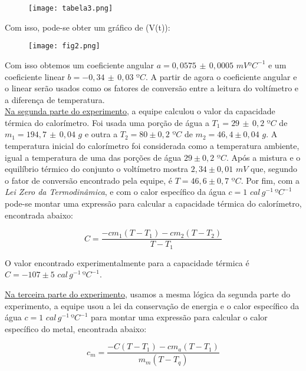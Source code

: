 \documentclass[a4paper, 12pt]{article}
\begin{document}
\begin{figure}[!h]
		\centering
		\texttt{[image: tabela3.png]}
		\end{figure}

Com isso, pode-se obter um gráfico de (V(t)):
\\

\begin{figure}[!h]
		\centering
		\texttt{[image: fig2.png]}
		\end{figure}

Com isso obtemos um coeficiente angular $a = 0,0575 \, \pm \, 0,0005 \, \,  mVºC^{-1}$ e um coeficiente linear $b = -0,34 \, \pm \, 0,03 \, \, ºC$. A partir de agora o coeficiente angular e o linear serão usados como os fatores de conversão entre a leitura do voltímetro e a diferença de temperatura.
\\

\underline{Na segunda parte do experimento}, a equipe calculou o valor da capacidade térmica do calorímetro. Foi usada uma porção de água a $T_1 = 29 \,  \pm  \, 0,2 \, \, ºC$  de $m_1 = 194,7 \,  \pm  \, 0,04 \, \, g$ e outra a $T_2 = 80 \pm 0,2 \, \, ºC$ de $m_2 = 46,4 \pm 0,04 \, \, g$. A temperatura inicial do calorímetro foi considerada como a temperatura ambiente, igual a temperatura de uma das porções de água $29 \pm 0,2 \, \, ºC$. Após a mistura e o equilíbrio térmico do conjunto o voltímetro mostra $2,34 \pm 0,01 \, \, mV$ que, segundo o fator de conversão encontrado pela equipe, é $T = 46,6 \pm 0,7 \, \, ºC$. Por fim, com a \textit{Lei Zero da Termodinâmica}, e com o calor específico da água $c = 1 \, \, cal \, g^{-1} \, ºC^{-1}$ pode-se montar uma expressão para calcular a capacidade térmica do calorímetro, encontrada abaixo:

$$ C = \dfrac{- c m_1 (T - T_1)  - c m_2 (T - T_2)}{T - T_1}$$

O valor encontrado experimentalmente para a capacidade térmica é $C = -107 \pm 5 \, \, cal \, g^{-1} \, ºC^{-1}$.

\pagebreak

\underline{Na terceira parte do experimento}, usamos a mesma lógica da segunda parte do experimento, a equipe usou a lei da conservação de energia e o calor específico da água $c = 1 \, \, cal \, g^{-1} \, ºC^{-1}$ para montar uma expressão para calcular o calor específico do metal, encontrada abaixo:

$$ c_m = \dfrac{- C (T - T_1)  - c m_a (T - T_1)}{m_m (T - T_q)} $$
\end{document}
